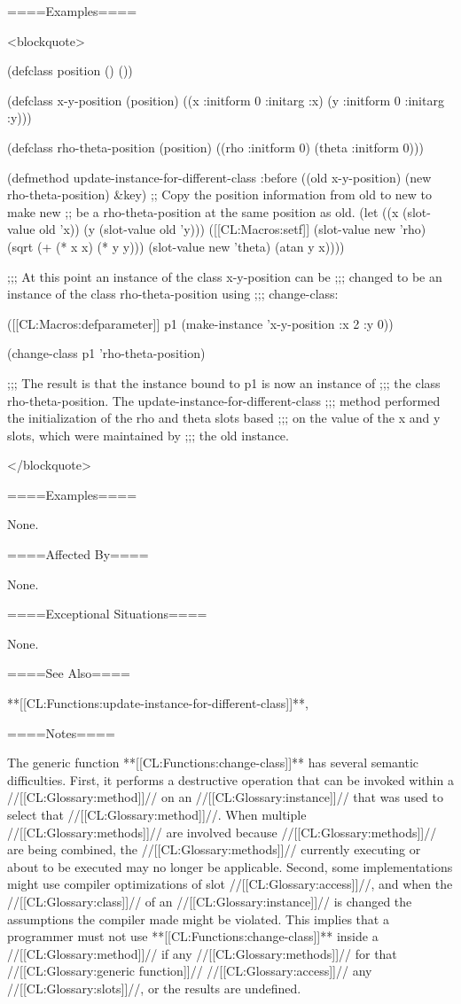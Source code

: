====Examples====

<blockquote>

(defclass position () ())

(defclass x-y-position (position) ((x :initform 0 :initarg :x) (y :initform 0 :initarg :y)))

(defclass rho-theta-position (position) ((rho :initform 0) (theta :initform 0)))

(defmethod update-instance-for-different-class :before ((old x-y-position) (new rho-theta-position) &key) ;; Copy the position information from old to new to make new ;; be a rho-theta-position at the same position as old. (let ((x (slot-value old 'x)) (y (slot-value old 'y))) ([[CL:Macros:setf]] (slot-value new 'rho) (sqrt (+ (* x x) (* y y))) (slot-value new 'theta) (atan y x))))

;;; At this point an instance of the class x-y-position can be ;;; changed to be an instance of the class rho-theta-position using ;;; change-class:

([[CL:Macros:defparameter]] p1 (make-instance 'x-y-position :x 2 :y 0))

(change-class p1 'rho-theta-position)

;;; The result is that the instance bound to p1 is now an instance of ;;; the class rho-theta-position. The update-instance-for-different-class ;;; method performed the initialization of the rho and theta slots based ;;; on the value of the x and y slots, which were maintained by ;;; the old instance.

</blockquote>

====Examples====

None.

====Affected By====

None.

====Exceptional Situations====

None.

====See Also====

**[[CL:Functions:update-instance-for-different-class]]**, {\secref\ChangingInstanceClass}

====Notes====

The generic function **[[CL:Functions:change-class]]** has several semantic difficulties. First, it performs a destructive operation that can be invoked within a //[[CL:Glossary:method]]// on an //[[CL:Glossary:instance]]// that was used to select that //[[CL:Glossary:method]]//. When multiple //[[CL:Glossary:methods]]// are involved because //[[CL:Glossary:methods]]// are being combined, the //[[CL:Glossary:methods]]// currently executing or about to be executed may no longer be applicable. Second, some implementations might use compiler optimizations of slot //[[CL:Glossary:access]]//, and when the //[[CL:Glossary:class]]// of an //[[CL:Glossary:instance]]// is changed the assumptions the compiler made might be violated. This implies that a programmer must not use **[[CL:Functions:change-class]]** inside a //[[CL:Glossary:method]]// if any //[[CL:Glossary:methods]]// for that //[[CL:Glossary:generic function]]// //[[CL:Glossary:access]]// any //[[CL:Glossary:slots]]//, or the results are undefined.


    
